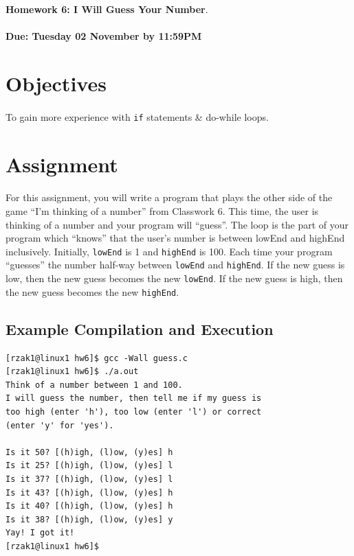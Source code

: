 \documentclass[letter,11pt]{article}
\begin{document}
\huge
\textbf{Homework 6: I Will Guess Your Number}.
\normalsize
\\ ~~ \\
\textbf{Due: Tuesday 02 November by 11:59PM}

\section*{Objectives}
\paragraph{}To gain more experience with \texttt{if} statements \& do-while loops.

\FloatBarrier
\section*{Assignment}
\paragraph{}For this assignment, you will write a program that plays the other side of the game ``I'm thinking of a number'' from Classwork 6. This time, the user is thinking of a number and your program will ``guess''. The loop is the part of your program which ``knows'' that the user's number is between lowEnd and highEnd inclusively. Initially, \texttt{lowEnd} is 1 and \texttt{highEnd} is 100. Each time your program ``guesses'' the number half-way between \texttt{lowEnd} and \texttt{highEnd}. If the new guess is low, then the new guess becomes the new \texttt{lowEnd}. If the new guess is high, then the new guess becomes the new \texttt{highEnd}.

\subsection*{Example Compilation and Execution}
\begin{verbatim}
[rzak1@linux1 hw6]$ gcc -Wall guess.c
[rzak1@linux1 hw6]$ ./a.out
Think of a number between 1 and 100.
I will guess the number, then tell me if my guess is
too high (enter 'h'), too low (enter 'l') or correct
(enter 'y' for 'yes').

Is it 50? [(h)igh, (l)ow, (y)es] h
Is it 25? [(h)igh, (l)ow, (y)es] l
Is it 37? [(h)igh, (l)ow, (y)es] l
Is it 43? [(h)igh, (l)ow, (y)es] h
Is it 40? [(h)igh, (l)ow, (y)es] h
Is it 38? [(h)igh, (l)ow, (y)es] y
Yay! I got it!
[rzak1@linux1 hw6]$ 
\end{verbatim}
\end{document}
